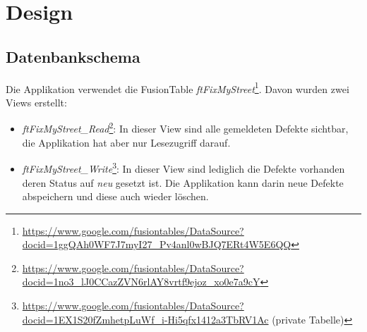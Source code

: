 \begin{figure}[H]
\end{figure}

\section{Design}

\subsection{Datenbankschema}
Die Applikation verwendet die FusionTable \emph{ftFixMyStreet}\footnote{\url{https://www.google.com/fusiontables/DataSource?docid=1ggQAh0WF7J7myI27_Pv4anl0wBJQ7ERt4W5E6QQ}}. Davon wurden zwei Views erstellt:

\begin{itemize}
\item \emph{ftFixMyStreet\_Read}\footnote{\url{https://www.google.com/fusiontables/DataSource?docid=1no3_lJ0CCazZVN6rlAY8vrtf9ejoz_xo0e7a9cY}}: In dieser View sind alle gemeldeten Defekte sichtbar, die Applikation hat aber nur Lesezugriff darauf.
\item \emph{ftFixMyStreet\_Write}\footnote{\url{https://www.google.com/fusiontables/DataSource?docid=1EX1S20fZmhetpLuWf_i-Hi5qfx1412a3TbRV1Ac} (private Tabelle)}: In dieser View sind lediglich die Defekte vorhanden deren Status auf \emph{neu} gesetzt ist. Die Applikation kann darin neue Defekte abspeichern und diese auch wieder löschen.
\end{itemize}

